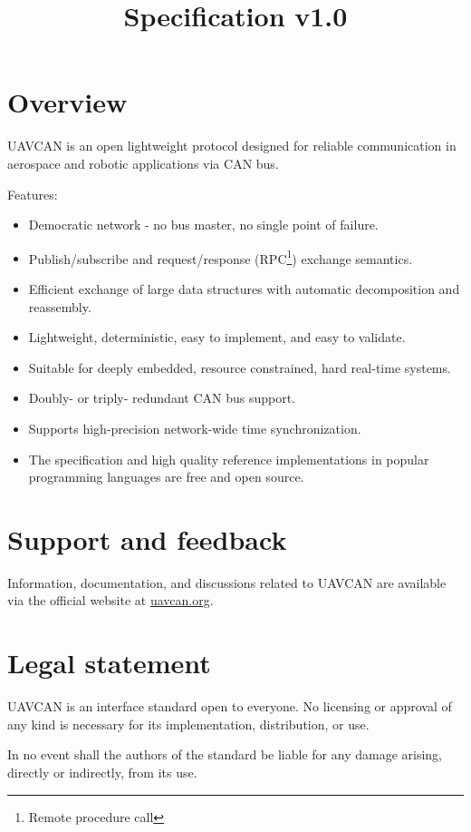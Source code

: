 \documentclass{uavcandoc}
\title{Specification v1.0}
\begin{document}
\frontmatter

\begin{titlepage}

\section*{Overview}

UAVCAN is an open lightweight protocol designed for reliable communication in aerospace and robotic applications via CAN bus.

Features:

\begin{itemize}
    \item Democratic network - no bus master, no single point of failure.
    \item Publish/subscribe and request/response (RPC\footnote{Remote procedure call}) exchange semantics.
    \item Efficient exchange of large data structures with automatic decomposition and reassembly.
    \item Lightweight, deterministic, easy to implement, and easy to validate.
    \item Suitable for deeply embedded, resource constrained, hard real-time systems.
    \item Doubly- or triply- redundant CAN bus support.
    \item Supports high-precision network-wide time synchronization.
    \item The specification and high quality reference implementations in popular programming languages are free and
    open source.
\end{itemize}

\BeginRightColumn

\section*{Support and feedback}

Information, documentation, and discussions related to UAVCAN are available via the official website at
\href{http://uavcan.org}{uavcan.org}.

\section*{Legal statement}

UAVCAN is an interface standard open to everyone.
No licensing or approval of any kind is necessary for its implementation, distribution, or use.

In no event shall the authors of the standard be liable for any damage arising, directly or indirectly, from its use.

\end{titlepage}

\tableofcontents
\clearpage
\listoffigures
\BeginRightColumn
\listoftables

\mainmatter







\end{document}
